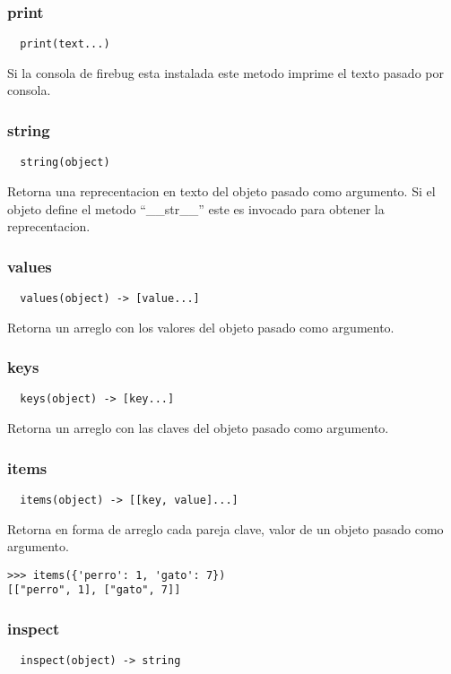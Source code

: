 \subsubsection*{print}
\begin{verbatim}
  print(text...)
\end{verbatim}
Si la consola de firebug esta instalada este metodo imprime el texto pasado por consola.

\subsubsection*{string}
\begin{verbatim}
  string(object)
\end{verbatim}
Retorna una reprecentacion en texto del objeto pasado como argumento.
Si el objeto define el metodo ``__str__'' este es invocado para obtener la reprecentacion.

\subsubsection*{values}
\begin{verbatim}
  values(object) -> [value...]
\end{verbatim}
Retorna un arreglo con los valores del objeto pasado como argumento.

\subsubsection*{keys}
\begin{verbatim}
  keys(object) -> [key...]
\end{verbatim}
Retorna un arreglo con las claves del objeto pasado como argumento.

\subsubsection*{items}
\begin{verbatim}
  items(object) -> [[key, value]...]
\end{verbatim}
Retorna en forma de arreglo cada pareja clave, valor de un objeto pasado como
argumento.
\begin{lstlisting}[style=consola]
>>> items({'perro': 1, 'gato': 7})
[["perro", 1], ["gato", 7]]
\end{lstlisting}

\subsubsection*{inspect}
\begin{verbatim}
  inspect(object) -> string
\end{verbatim}

